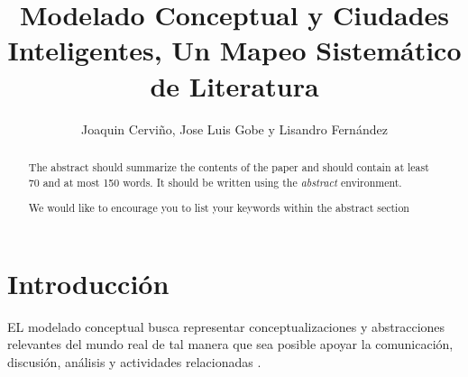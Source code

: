 \documentclass[runningheads,a4paper,spanish]{llncs}
\newcommand{\keywords}[1]{\par\addvspace\baselineskip
\noindent\keywordname\enspace\ignorespaces#1}
\begin{document}
\mainmatter  %

\title{Modelado Conceptual y Ciudades Inteligentes, Un Mapeo Sistemático de Literatura}


%
%
\author{Joaquin Cerviño, Jose Luis Gobe y Lisandro Fernández}
%


%


\maketitle
\begin{abstract}
The abstract should summarize the contents of the paper and should
contain at least 70 and at most 150 words. It should be written using the
\emph{abstract} environment.
\keywords{We would like to encourage you to list your keywords within
the abstract section}
\end{abstract}


\section{Introducción}


EL modelado conceptual busca representar conceptualizaciones y abstracciones
relevantes del mundo real de tal manera que sea posible apoyar la comunicación,
discusión, análisis y actividades relacionadas \cite{Delcambre2019}.
\end{document}
